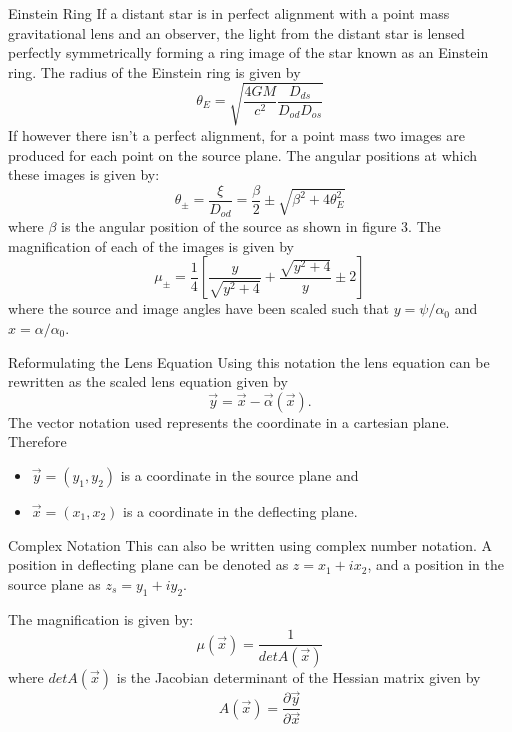 \documentclass[aspectratio=1610,xcolor=dvipsnames,t]{beamer}
\begin{document}
\begin{frame}{Einstein Ring} 
    If a distant star is in perfect alignment with a point mass gravitational
    lens and an observer, the light from the distant star is lensed 
    perfectly symmetrically forming a ring image of the star known as an
    Einstein ring. The radius of the Einstein ring is given by
    \begin{equation}
        \theta_{E} = \sqrt{\frac{4GM}{c^2} \frac{D_{ds}}{D_{od} D_{os}}}
    \end{equation}
    If however there isn't a perfect alignment, for a point mass two
    images are produced for each point on the source plane. 
    The angular positions at which these images is given by:
    \begin{equation}
        \theta_{\pm} = \frac{\xi}{D_{od}}
                 = \frac{\beta}{2} \pm \sqrt{\beta^2 + 4\theta^{2}_{E}}
    \end{equation}
    where $\beta$ is the angular position of the source as shown in figure 3.
    The magnification of each of the images is given by
    \begin{equation}
        \mu_{\pm} = \frac{1}{4} 
                \left[ 
                    \frac{y}{\sqrt{y^2 + 4}} 
                    +
                    \frac{\sqrt{y^2 + 4}}{y} 
                    \pm 2
                \right]
    \end{equation}
    where the source and image angles have been scaled such that 
    $y = \psi / \alpha_0$ and $x = \alpha / \alpha_0$.
\end{frame} 

\begin{frame}{Reformulating the Lens Equation} 
Using this notation the lens equation can be rewritten as the scaled
lens equation given by
\begin{equation}
    \vec{y} = \vec{x} - \vec{\alpha}(\vec{x}).
\end{equation}
The vector notation used represents the coordinate in a cartesian plane.
Therefore
\begin{itemize}
    \item $\vec{y} = (y_1, y_2)$ is a coordinate in the source plane and
    \item $\vec{x} = (x_1, x_2)$ is a coordinate in the deflecting plane.
\end{itemize}
\end{frame} 

\begin{frame}{Complex Notation}  
This can also be written using complex number notation. A position in 
deflecting plane can be denoted as $z = x_1 + ix_2$, and a position in the
source plane as $z_s = y_1 + iy_2$.

The magnification is given by:
\begin{equation}
    \mu(\vec{x}) = \frac{1}{det A(\vec{x})}
\end{equation}
where $det A(\vec{x})$ is the Jacobian determinant of the Hessian matrix
given by
\begin{equation}
    A(\vec{x}) = \frac{\partial \vec{y}}{\partial \vec{x}}
\end{equation}
\end{frame} 
\end{document}
